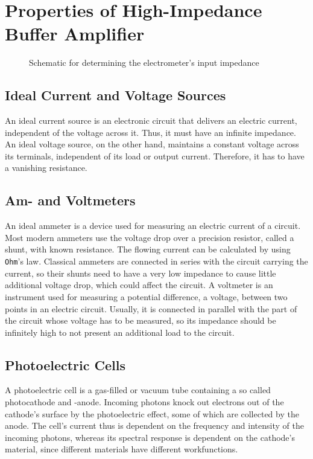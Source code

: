 \chapter{Properties of High-Impedance Buffer Amplifier}
\begin{figure}
	\centering
	\caption{Schematic for determining the electrometer's input impedance}
	\label{fig:elec_in_im}
\end{figure}

\section{Ideal Current and Voltage Sources}
An ideal current source is an electronic circuit that delivers an electric current, independent of the voltage across it.
Thus, it must have an infinite impedance.
An ideal voltage source, on the other hand, maintains a constant voltage across its terminals, independent of its load or output current.
Therefore, it has to have a vanishing resistance.

\section{Am- and Voltmeters}
An ideal ammeter is a device used for measuring an electric current of a circuit.
Most modern ammeters use the voltage drop over a precision resistor, called a shunt, with known resistance.
The flowing current can be calculated by using \texttt{Ohm}'s law.
Classical ammeters are connected in series with the circuit carrying the current, so their shunts need to have a very low impedance to cause little additional voltage drop, which could affect the circuit.
A voltmeter is an instrument used for measuring a potential difference, a voltage, between two points in an electric circuit.
Usually, it is connected in parallel with the part of the circuit whose voltage has to be measured, so its impedance should be infinitely high to not present an additional load to the circuit.

\section{Photoelectric Cells}
A photoelectric cell is a gas-filled or vacuum tube containing a so called photocathode and -anode.
Incoming photons knock out electrons out of the cathode's surface by the photoelectric effect, some of which are collected by the anode.%
The cell's current thus is dependent on the frequency and intensity of the incoming photons, whereas its spectral response is dependent on the cathode's material, since different materials have different workfunctions.

